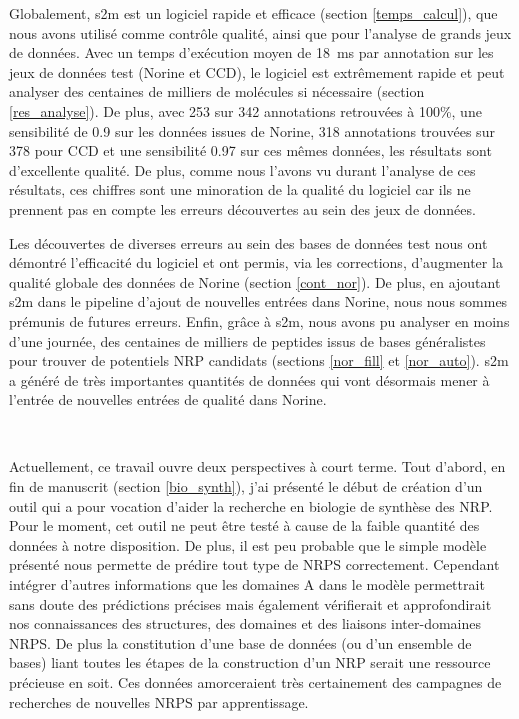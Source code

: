 Globalement, s2m est un logiciel rapide et efficace (section \ref{temps_calcul}), que nous avons utilisé comme contrôle qualité, ainsi que pour l'analyse de grands jeux de données.
Avec un temps d'exécution moyen de 18~ms par annotation sur les jeux de données test (Norine et CCD), le logiciel est extrêmement rapide et peut analyser des centaines de milliers de molécules si nécessaire (section \ref{res_analyse}).
De plus, avec 253 sur 342 annotations retrouvées à 100\%, une sensibilité de 0.9 sur les données issues de Norine, 318 annotations trouvées sur 378 pour CCD et une sensibilité 0.97 sur ces mêmes données, les résultats sont d'excellente qualité.
De plus, comme nous l'avons vu durant l'analyse de ces résultats, ces chiffres sont une minoration de la qualité du logiciel car ils ne prennent pas en compte les erreurs découvertes au sein des jeux de données.

Les découvertes de diverses erreurs au sein des bases de données test nous ont démontré l'efficacité du logiciel et ont permis, via les corrections, d'augmenter la qualité globale des données de Norine (section \ref{cont_nor}).
De plus, en ajoutant s2m dans le pipeline d'ajout de nouvelles entrées dans Norine, nous nous sommes prémunis de futures erreurs.
Enfin, grâce à s2m, nous avons pu analyser en moins d'une journée, des centaines de milliers de peptides issus de bases généralistes pour trouver de potentiels NRP candidats (sections \ref{nor_fill} et \ref{nor_auto}).
s2m a généré de très importantes quantités de données qui vont désormais mener à l'entrée de nouvelles entrées de qualité dans Norine.


~~


Actuellement, ce travail ouvre deux perspectives à court terme.
Tout d'abord, en fin de manuscrit (section \ref{bio_synth}), j'ai présenté le début de création d'un outil qui a pour vocation d'aider la recherche en biologie de synthèse des NRP.
Pour le moment, cet outil ne peut être testé à cause de la faible quantité des données à notre disposition.
De plus, il est peu probable que le simple modèle présenté nous permette de prédire tout type de NRPS correctement.
Cependant intégrer d'autres informations que les domaines A dans le modèle permettrait sans doute des prédictions précises mais également vérifierait et approfondirait nos connaissances des structures, des domaines et des liaisons inter-domaines NRPS.
De plus la constitution d'une base de données (ou d'un ensemble de bases) liant toutes les étapes de la construction d'un NRP serait une ressource précieuse en soit.
Ces données amorceraient très certainement des campagnes de recherches de nouvelles NRPS par apprentissage.


